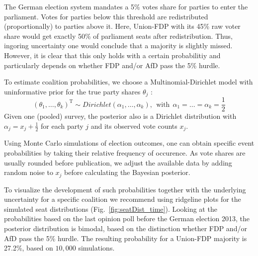 \documentclass[smallcondensed]{svjour3}     %
\newcommand{\T}{\mathrm{\scriptscriptstyle T}}
\begin{document}
The German election system mandates a 5\% votes share for parties to enter the parliament.
Votes for parties below this threshold are redistributed (proportionally) to parties
above it.
Here, Union-FDP with its 45\% raw voter share would get exactly 50\% of parliament seats after redistribution. Thus, ingoring uncertainty one would conclude that a majority is slightly missed. However, it is clear that this only holds with a certain probabilitiy and particularly depends on whether FDP and/or AfD pass the 5\% hurdle.


To estimate coalition probabilities, we choose a Multinomial-Dirichlet model with uninformative prior for the true party shares
$\theta_j$ \citep{gelman_2013}:
\begin{equation}
(\theta_1,\ldots,\theta_k)^\T \sim Dirichlet(\alpha_1,\ldots,\alpha_k), \ \ \text{with} \ \ \alpha_1 = \ldots = \alpha_k = \frac{1}{2}
\end{equation}
Given one (pooled) survey, the posterior also is a Dirichlet distribution
with $\alpha_j = x_j + \frac{1}{2}$ for each party $j$ and its observed
vote counts $x_j$.

Using Monte Carlo simulations of election outcomes, one can obtain
specific event probabilities by taking their relative frequency of
occurence. As vote shares are usually rounded before publication,
we adjust the available data by adding random noise to $x_j$ before
calculating the Bayesian posterior.

To visualize the development of such probabilities together with the underlying uncertainty for a specific coalition we recommend using ridgeline plots \citep{wilke_2017} for the simulated seat distributions (Fig.~\ref{fig:seatDist_time}). Looking at the probabilities based on the last opinion poll before the German election 2013, the posterior distribution is bimodal, based on the distinction whether FDP and/or AfD pass the 5\% hurdle. The resulting probability for a Union-FDP majority is 27.2\%, based on $10,000$ simulations.
\end{document}
